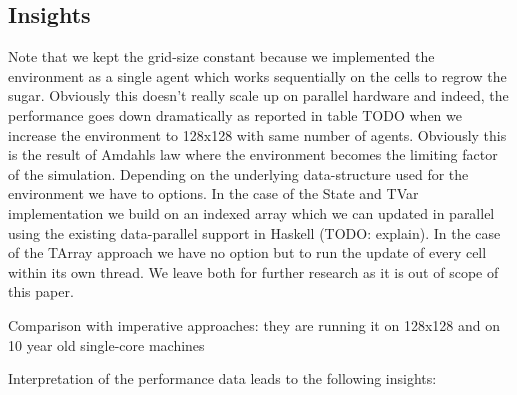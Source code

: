 \subsection{Insights}
Note that we kept the grid-size constant because we implemented the environment as a single agent which works sequentially on the cells to regrow the sugar. Obviously this doesn't really scale up on parallel hardware and indeed, the performance goes down dramatically as reported in table TODO when we increase the environment to 128x128 with same number of agents. Obviously this is the result of Amdahls law where the environment becomes the limiting factor of the simulation.
Depending on the underlying data-structure used for the environment we have to options. In the case of the State and TVar implementation we build on an indexed array which we can updated in parallel using the existing data-parallel support in Haskell (TODO: explain). In the case of the TArray approach we have no option but to run the update of every cell within its own thread. We leave both for further research as it is out of scope of this paper.

Comparison with imperative approaches: they are running it on 128x128 and on 10 year old single-core machines  \cite{lysenko_framework_2008}

Interpretation of the performance data leads to the following insights:
